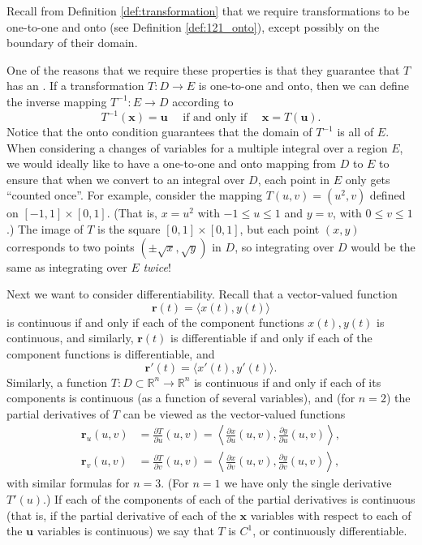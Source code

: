 Recall from Definition \ref{def:transformation} that we require transformations to be one-to-one and onto (see Definition \ref{def:121_onto}), except possibly on the boundary of their domain.

One of the reasons that we require these properties is that they guarantee that $T$ has an .  If a transformation $T:D\to E$ is one-to-one and onto, then we can define the inverse mapping $T^{-1}:E\to D$ according to
\[
T^{-1}(\mathbf{x}) = \mathbf{u} \quad\text{ if and only if }\quad \mathbf{x} = T(\mathbf{u}).
\]
Notice that the onto condition guarantees that the domain of $T^{-1}$ is all of $E$. When considering a changes of variables for a multiple integral over a region $E$, we would ideally like to have a one-to-one and onto mapping from $D$ to $E$ to ensure that when we convert to an integral over $D$, each point in $E$ only gets ``counted once''. For example, consider the mapping $T(u,v)=(u^2,v)$ defined on $[-1,1]\times [0,1]$. (That is, $x=u^2$ with $-1\leq u\leq 1$ and $y=v$, with $0\leq v\leq 1$.) The image of $T$ is the square $[0,1]\times [0,1]$, but each point $(x,y)$ corresponds to two points $(\pm \sqrt{x},\sqrt{y})$ in $D$, so integrating over $D$ would be the same as integrating over $E$ {\em twice}!

Next we want to consider differentiability. Recall that a vector-valued function
\[
\mathbf{r}(t) = \langle x(t),y(t)\rangle
\]
is continuous if and only if each of the component functions $x(t), y(t)$ is continuous, and similarly, $\mathbf{r}(t)$ is differentiable if and only if each of the component functions is differentiable, and 
\[
\mathbf{r}'(t) = \langle x'(t), y'(t)\rangle.
\]
Similarly, a function $T:D\subset \mathbb{R}^n \to \mathbb{R}^n$ is continuous if and only if each of its components is continuous (as a function of several variables), and (for $n=2$) the partial derivatives of $T$ can be viewed as the vector-valued functions
\begin{align*}
\mathbf{r}_u(u,v) &= \frac{\partial T}{\partial u}(u,v) = \left<\frac{\partial x}{\partial u}(u,v),\frac{\partial y}{\partial u}(u,v)\right>,\\
\mathbf{r}_v(u,v) &= \frac{\partial T}{\partial v}(u,v) = \left<\frac{\partial x}{\partial v}(u,v),\frac{\partial y}{\partial v}(u,v)\right>,
\end{align*}
with similar formulas for $n=3$. (For $n=1$ we have only the single derivative $T'(u)$.) If each of the components of each of the partial derivatives is continuous (that is, if the partial derivative of each of the $\mathbf{x}$ variables with respect to each of the $\mathbf{u}$ variables is continuous) we say that $T$ is $C^1$, or continuously differentiable.

